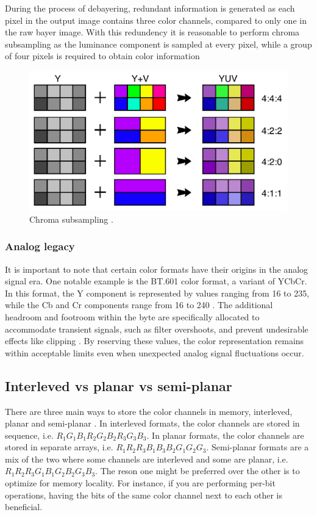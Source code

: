 During the process of debayering, redundant information is generated as each pixel in the output image contains three color channels, compared to only one in the raw bayer image.
With this redundency it is reasonable to perform chroma subsampling as the luminance component is sampled at every pixel, while a group of four pixels is required to obtain color information

\begin{figure}[H]
    \centering
    \includegraphics[width=.6\textwidth]{figures/debayer/chroma_subsampling.pdf}
    \caption{Chroma subsampling \cite{stevo-88EnglishMostWidely2010}.}
    \label{fig:chroma_subsampling}
\end{figure}


\subsubsection{Analog legacy}
It is important to note that certain color formats have their origins in the analog signal era.
One notable example is the BT.601 color format, a variant of YCbCr.
In this format, the Y component is represented by values ranging from 16 to 235, while the Cb and Cr components range from 16 to 240 \cite{YCbCr2023}.
The additional headroom and footroom within the byte are specifically allocated to accommodate transient signals, such as filter overshoots, and prevent undesirable effects like clipping \cite{Rec6012023}.
By reserving these values, the color representation remains within acceptable limits even when unexpected analog signal fluctuations occur.


\subsection{Interleved vs planar vs semi-planar}
There are three main ways to store the color channels in memory, interleved, planar and semi-planar \cite{baranYUVFormats2018}.
In interleved formats, the color channels are stored in sequence, i.e.
$R_1 G_1 B_1 R_2 G_2 B_2 R_3 G_3 B_3$.
In planar formats, the color channels are stored in separate arrays, i.e.
$R_1 R_2 R_3 B_1 B_3 B_2 G_1 G_2 G_3$.
Semi-planar formats are a mix of the two where some channels are interleved and some are planar, i.e.
$R_1 R_2 R_3 G_1 B_1 G_2 B_2 G_3 B_3$.
The reson one might be preferred over the other is to optimize for memory locality.
For instance, if you are performing per-bit operations, having the bits of the same color channel next to each other is beneficial.


